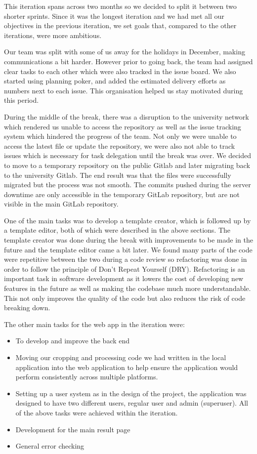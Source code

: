 \documentclass{l3proj}
\begin{document}
This iteration spans across two months so we decided to split it between two shorter sprints. Since it was the longest iteration and we had met all our objectives in the previous iteration, we set goals that, compared to the other iterations, were more ambitious.

Our team was split with some of us away for the holidays in December, making communications a bit harder. However prior to going back, the team had assigned clear tasks to each other which were also tracked in the issue board. We also started using planning poker, and added the estimated delivery efforts as numbers next to each issue. This organisation helped us stay motivated during this period. 

During the middle of the break, there was a disruption to the university network which rendered us unable to access the repository as well as the issue tracking system which hindered the progress of the team. Not only we were unable to access the latest file or update the repository, we were also not able to track issues which is necessary for task delegation until the break was over. We decided to move to a temporary repository on the public Gitlab and later migrating back to the university Gitlab. The end result was that the files were successfully migrated but the process was not smooth. The commits pushed during the server downtime are only accessible in the temporary GitLab repository, but are not visible in the main GitLab repository. 

One of the main tasks was to develop a template creator, which is followed up by a template editor, both of which were described in the above sections. The template creator was done during the break with improvements to be made in the future and the template editor came a bit later. We found many parts of the code were repetitive between the two during a code review so refactoring was done in order to follow the principle of Don’t Repeat Yourself (DRY). Refactoring is an important task in software development as it lowers the cost of developing new features in the future as well as making the codebase much more understandable. This not only improves the quality of the code but also reduces the risk of code breaking down.

The other main tasks for the web app in the iteration were:
\begin{itemize}
\item To develop and improve the back end
\item Moving our cropping and processing code we had written in the local application into the web application to help ensure the application would perform consistently across multiple platforms.
\item Setting up a user system as in the design of the project, the application was designed to have two different users, regular user and admin (superuser). All of the above tasks were achieved within the iteration.
\item Development for the main result page
\item General error checking
\end{itemize}
\end{document}
